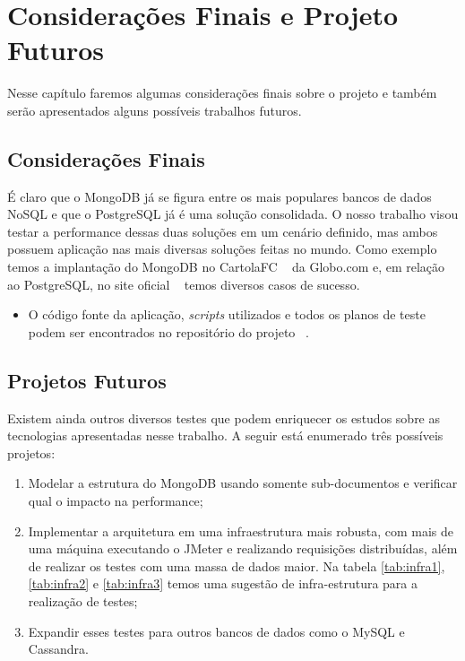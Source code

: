 \chapter{Considerações Finais e Projeto Futuros}

Nesse capítulo faremos algumas considerações finais sobre o projeto e também serão apresentados alguns possíveis trabalhos futuros.

\section{Considerações Finais}

É claro que o MongoDB já se figura entre os mais populares bancos de dados NoSQL e que o PostgreSQL já é uma solução consolidada. O nosso trabalho visou testar a performance dessas duas soluções em um cenário definido, mas ambos possuem aplicação nas mais diversas soluções feitas no mundo. Como exemplo temos a implantação do MongoDB no CartolaFC ~\cite{mongocartola} da Globo.com e, em relação ao PostgreSQL, no site oficial ~\cite{usecasepostgresql}  temos diversos casos de sucesso.

\begin{itemize}
	\item O código fonte da aplicação, \textit{scripts} utilizados e todos os planos de teste podem ser encontrados no repositório do projeto ~\cite{github}.
\end{itemize}

\section{Projetos Futuros}

Existem ainda outros diversos testes que podem enriquecer os estudos sobre as tecnologias apresentadas nesse trabalho. A seguir está enumerado três possíveis projetos:

\begin{enumerate}
\item Modelar a estrutura do MongoDB usando somente sub-documentos e verificar qual o impacto na performance;
\item Implementar a arquitetura em uma infraestrutura mais robusta, com mais de uma máquina executando o JMeter e realizando requisições distribuídas, além de realizar os testes com uma massa de dados maior. Na tabela \ref{tab:infra1}, \ref{tab:infra2} e \ref{tab:infra3} temos uma sugestão de infra-estrutura para a realização de testes;
\item Expandir esses testes para outros bancos de dados como o MySQL e Cassandra.
\end{enumerate}

